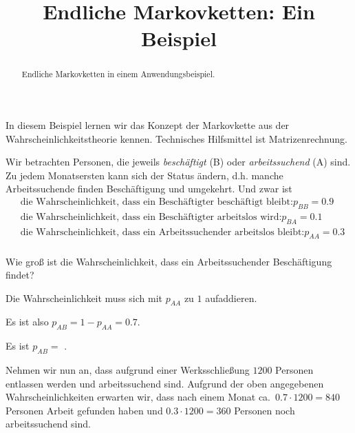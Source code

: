 \documentclass{ximera}
\title{Endliche Markovketten: Ein Beispiel}
\begin{document}
\begin{abstract}
Endliche Markovketten in einem Anwendungsbeispiel.
\end{abstract}
\maketitle

In diesem Beispiel lernen wir das Konzept der Markovkette aus der Wahrscheinlichkeitstheorie kennen. Technisches Hilfsmittel ist Matrizenrechnung.

Wir betrachten Personen, die jeweils \emph{beschäftigt} (B) oder \emph{arbeitssuchend} (A) sind. Zu jedem Monatsersten kann sich der Status ändern, d.h. manche Arbeitssuchende finden Beschäftigung und umgekehrt. Und zwar ist
\begin{align*}
& \text{die Wahrscheinlichkeit, dass ein Beschäftigter beschäftigt bleibt:} p_{BB} = 0.9 \\
& \text{die Wahrscheinlichkeit, dass ein Beschäftigter arbeitslos wird:} p_{BA} = 0.1 \\
& \text{die Wahrscheinlichkeit, dass ein Arbeitssuchender arbeitslos bleibt:} p_{AA} = 0.3 \\
\end{align*}


\begin{question}
Wie groß ist die Wahrscheinlichkeit, dass ein Arbeitssuchender Beschäftigung findet?
\begin{solution}
\begin{hint}
Die Wahrscheinlichkeit muss sich mit $p_{AA}$ zu $1$ aufaddieren.
\end{hint}
\begin{hint}
Es ist also $p_{AB} = 1 - p_{AA} = 0.7$.
\end{hint}
Es ist $p_{AB} =$ .
\end{solution}
\end{question}


Nehmen wir nun an, dass aufgrund einer Werksschließung $1200$ Personen entlassen werden und arbeitssuchend sind. Aufgrund der oben angegebenen Wahrscheinlichkeiten erwarten wir, dass nach einem Monat ca.~$0.7 \cdot 1200 = 840$ Personen Arbeit gefunden haben und $0.3\cdot 1200 = 360$ Personen noch arbeitssuchend sind.
\end{document}
